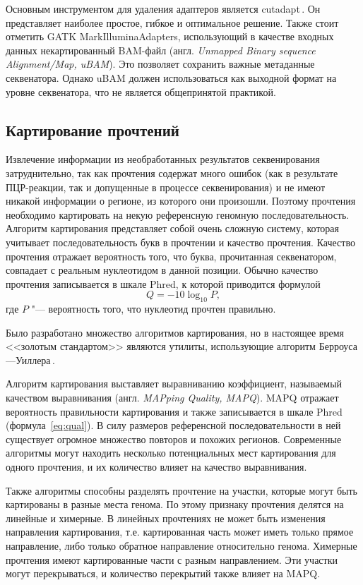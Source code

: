 \documentclass[12pt, twoside, a4paper]{article}
\newcommand{\utilname}[1]{\textenglish{#1}}
\newcommand{\engterm}[1]{англ. \textenglish{\textit{#1}}}
\newcommand{\formularef}[1]{формула~\ref{#1}}
\begin{document}
Основным инструментом для удаления адаптеров является \utilname{cutadapt}\,\cite{Martin_2011}.
Он представляет наиболее простое, гибкое и оптимальное решение.
Также стоит отметить \utilname{GATK MarkIlluminaAdapters}\cite{Auwera_2013}, использующий в качестве входных данных некартированный BAM-файл (\engterm{Unmapped Binary sequence Alignment/Map, uBAM}). Это позволяет сохранить важные метаданные секвенатора. Однако uBAM должен использоваться как выходной формат на уровне секвенатора, что не является общепринятой практикой.

\subsection*{Картирование прочтений}

Извлечение информации из необработанных результатов секвенирования затруднительно, так как прочтения содержат много ошибок (как в результате ПЦР\hyp{}реакции, так и допущенные в процессе секвенирования) и не имеют никакой информации о регионе, из которого они произошли.
Поэтому прочтения необходимо картировать на некую референсную геномную последовательность.
Алгоритм картирования представляет собой очень сложную систему, которая учитывает последовательность букв в прочтении и качество прочтения.
Качество прочтения отражает вероятность того, что буква, прочитанная секвенатором, совпадает с реальным нуклеотидом в данной позиции.
Обычно качество прочтения записывается в шкале Phred, к которой приводится формулой \begin{equation}Q = -10\log_{10}P,\label{eq:qual}\end{equation} где $P$ "--- вероятность того, что нуклеотид прочтен правильно.

Было разработано множество алгоритмов картирования, но в настоящее время <<золотым стандартом>> являются утилиты, использующие алгоритм Берроуса---Уиллера\,\cite{Burrows_1994}.

Алгоритм картирования выставляет выравниванию коэффициент, называемый качеством выравнивания (\engterm{MAPping Quality, MAPQ}).
MAPQ отражает вероятность правильности картирования и также записывается в шкале Phred (\formularef{eq:qual}).
В силу размеров референсной последовательности в ней существует огромное множество повторов и похожих регионов.
Современные алгоритмы могут находить несколько потенциальных мест картирования для одного прочтения, и их количество влияет на качество выравнивания.

Также алгоритмы способны разделять прочтение на участки, которые могут быть картированы в разные места генома.
По этому признаку прочтения делятся на линейные и химерные.
В линейных прочтениях не может быть изменения направления картирования, т.е. картированная часть может иметь только прямое направление, либо только обратное направление относительно генома.
Химерные прочтения имеют картированные части с разным направлением.
Эти участки могут перекрываться, и количество перекрытий также влияет на MAPQ.
\end{document}
